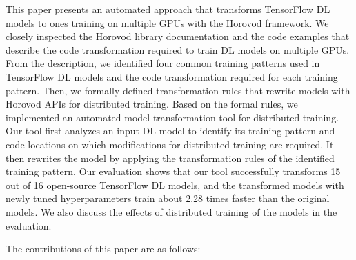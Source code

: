 This paper presents an automated approach that transforms TensorFlow DL models
to ones training on multiple GPUs with the Horovod framework.
We closely inspected the Horovod library documentation and the code examples
that describe the code transformation required to train DL models on multiple
GPUs.
From the description, we identified four common training patterns used in
TensorFlow DL models and the code transformation required for each training
pattern.
Then, we formally defined transformation rules that rewrite models with Horovod
APIs for distributed training.
Based on the formal rules, we implemented an automated model transformation
tool for distributed training.
Our tool first analyzes an input DL model to identify its training
pattern and code locations on which modifications for distributed training
are required.
It then rewrites the model by applying the transformation rules of the
identified training pattern.
Our evaluation shows that our tool successfully transforms 15 out of 16
open-source TensorFlow DL models, and the transformed models with newly tuned
hyperparameters train about 2.28 times faster than the original models.
We also discuss the effects of distributed training of the models in the
evaluation.



The contributions of this paper are as follows:

